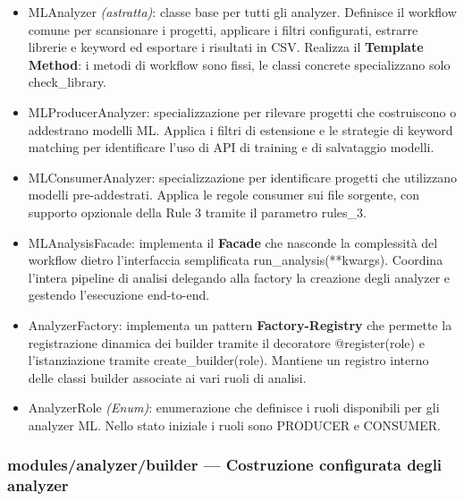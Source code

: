 \documentclass[11pt,a4paper]{article}
\makeatletter
\newif\ifmark@prevlower
\def\mark@casebreak#1{%
  \ifcat\noexpand#1\relax
    \mark@prevlowerfalse
  \else
    \ifnum`#1=\uccode`#1\relax
      \ifmark@prevlower\allowbreak\fi
      \mark@prevlowerfalse
    \else
      \ifnum`#1=\lccode`#1\relax
        \mark@prevlowertrue
      \else
        \mark@prevlowerfalse
      \fi
    \fi
  \fi}
\def\mark@brk#1{%
  \ifx#1\mark@stop
    \let\mark@next\relax
  \else
    \mark@casebreak{#1}%
    #1%
    \ifx#1.\allowbreak\else
      \ifx#1\_\allowbreak\else
        \ifx#1/\allowbreak\else
          \ifx#1(\allowbreak\fi
        \fi
      \fi
    \fi
    \let\mark@next\mark@brk
  \fi
  \mark@next}
\def\mark@stop{\mark@stop}
\DeclareRobustCommand{\mark@code}[1]{%
  \ifmmode
    \text{\ttfamily\small\mark@prevlowerfalse\mark@brk#1\mark@stop}%
  \else
    {\ttfamily\small\mark@prevlowerfalse\mark@brk#1\mark@stop}%
  \fi}
\DeclareRobustCommand{\code}[1]{\mark@code{#1}}
\DeclareRobustCommand{\cls}[1]{\mark@code{#1}}
\DeclareRobustCommand{\meth}[1]{\mark@code{#1}}
\DeclareRobustCommand{\pkgpath}[1]{\mark@code{#1}}
\DeclareRobustCommand{\flag}[1]{\mark@code{#1}}
\def\mark@code#1{#1}%
\def\code#1{#1}%
\def\cls#1{#1}%
\def\meth#1{#1}%
\def\pkgpath#1{#1}%
\def\flag#1{#1}%
\makeatother
\begin{document}
\begin{itemize}
  \item \cls{MLAnalyzer} \emph{(astratta)}: classe base per tutti gli analyzer.
    Definisce il workflow comune per scansionare i progetti, applicare i filtri
    configurati, estrarre librerie e keyword ed esportare i risultati in CSV.
    Realizza il \textbf{Template Method}: i metodi di workflow sono fissi, le
    classi concrete specializzano solo \meth{check\_library}.

  \item \cls{MLProducerAnalyzer}: specializzazione per rilevare progetti che
    costruiscono o addestrano modelli ML. Applica i filtri di estensione e le
    strategie di keyword matching per identificare l'uso di API di training e
    di salvataggio modelli.

  \item \cls{MLConsumerAnalyzer}: specializzazione per identificare progetti che
    utilizzano modelli pre-addestrati. Applica le regole consumer sui file
    sorgente, con supporto opzionale della Rule 3 tramite il parametro
    \flag{rules\_3}.

  \item \cls{MLAnalysisFacade}: implementa il \textbf{Facade} che nasconde la
    complessit\`a del workflow dietro l'interfaccia semplificata
    \meth{run\_analysis(**kwargs)}. Coordina l'intera pipeline di analisi
    delegando alla factory la creazione degli analyzer e gestendo l'esecuzione
    end-to-end.

  \item \cls{AnalyzerFactory}: implementa un pattern \textbf{Factory-Registry}
    che permette la registrazione dinamica dei builder tramite il decoratore
    \meth{@register(role)} e l'istanziazione tramite
    \meth{create\_builder(role)}. Mantiene un registro interno delle classi
    builder associate ai vari ruoli di analisi.

  \item \cls{AnalyzerRole} \emph{(Enum)}: enumerazione che definisce i ruoli
    disponibili per gli analyzer ML. Nello stato iniziale i ruoli sono
    \code{PRODUCER} e \code{CONSUMER}.
\end{itemize}

\subsubsection{\pkgpath{modules/analyzer/builder} --- Costruzione configurata degli analyzer}
\end{document}
